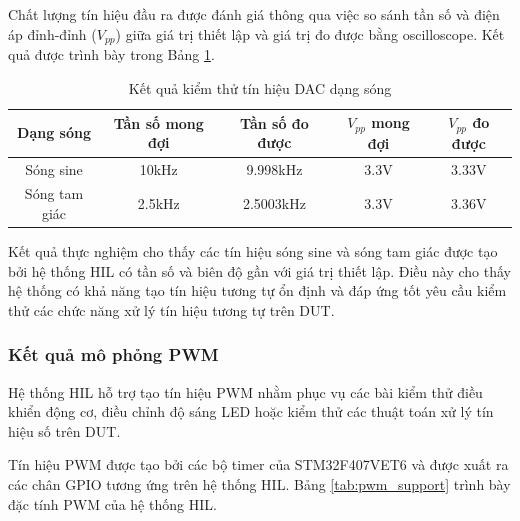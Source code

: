 Chất lượng tín hiệu đầu ra được đánh giá thông qua việc so sánh tần số và điện áp đỉnh-đỉnh ($V_{pp}$) giữa giá trị thiết lập và giá trị đo được bằng oscilloscope. Kết quả được trình bày trong Bảng \ref{tab:dac_wave_result}.

\begin{table}[H]
\centering
\caption{Kết quả kiểm thử tín hiệu DAC dạng sóng}
\label{tab:dac_wave_result}
\renewcommand{\arraystretch}{1.2}

\begin{tabular}{|c|c|c|c|c|}
\hline
\textbf{Dạng sóng} 
& \textbf{Tần số mong đợi} 
& \textbf{Tần số đo được} 
& \textbf{$V_{pp}$ mong đợi} 
& \textbf{$V_{pp}$ đo được} \\
\hline

Sóng sine
& 10kHz 
& 9.998kHz 
& 3.3V 
& 3.33V \\
\hline

Sóng tam giác
& 2.5kHz 
& 2.5003kHz 
& 3.3V 
& 3.36V \\
\hline

\end{tabular}
\end{table}

Kết quả thực nghiệm cho thấy các tín hiệu sóng sine và sóng tam giác được tạo bởi hệ thống HIL có tần số và biên độ gần với giá trị thiết lập. Điều này cho thấy hệ thống có khả năng tạo tín hiệu tương tự ổn định và đáp ứng tốt yêu cầu kiểm thử các chức năng xử lý tín hiệu tương tự trên DUT.

\subsubsection{Kết quả mô phỏng PWM}

Hệ thống HIL hỗ trợ tạo tín hiệu PWM nhằm phục vụ các bài kiểm thử điều khiển động cơ, điều chỉnh độ sáng LED hoặc kiểm thử các thuật toán xử lý tín hiệu số trên DUT.

Tín hiệu PWM được tạo bởi các bộ timer của STM32F407VET6 và được xuất ra các chân GPIO tương ứng trên hệ thống HIL. Bảng \ref{tab:pwm_support} trình bày đặc tính PWM của hệ thống HIL.

